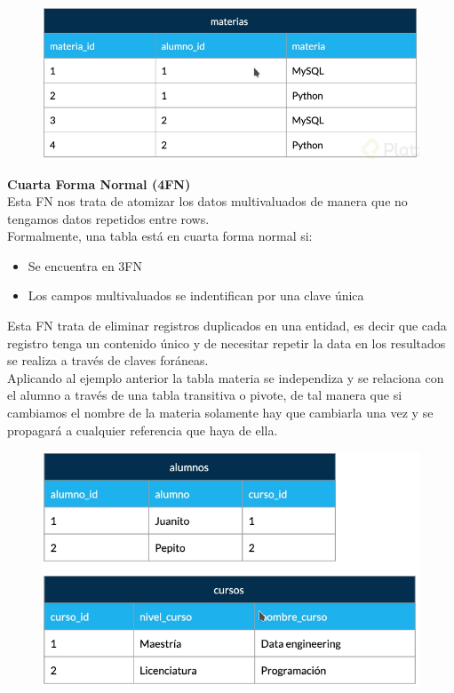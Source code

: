 \documentclass{article}
\begin{document}
\begin{figure}[h!]
    \centering
      \includegraphics[scale=0.5]{./Pictures/032_normalizacion.png}
\end{figure}

\textbf{Cuarta Forma Normal (4FN)}\\
Esta FN nos trata de atomizar los datos multivaluados de manera que no tengamos
datos repetidos entre rows.\\

Formalmente, una tabla está en cuarta forma normal si:
\begin{itemize}
  \item Se encuentra en 3FN
  \item Los campos multivaluados se indentifican por una clave única
\end{itemize}

Esta FN trata de eliminar registros duplicados en una entidad, es decir que
cada registro tenga un contenido único y de necesitar repetir la data en los
resultados se realiza a través de claves foráneas.\\

Aplicando al ejemplo anterior la tabla materia se independiza y se relaciona
con el alumno a través de una tabla transitiva o pivote, de tal manera que si
cambiamos el nombre de la materia solamente hay que cambiarla una vez y se
propagará a cualquier referencia que haya de ella.

\begin{figure}[h!]
    \centering
      \includegraphics[scale=0.5]{./Pictures/033_normalizacion.png}
\end{figure}
\end{document}
